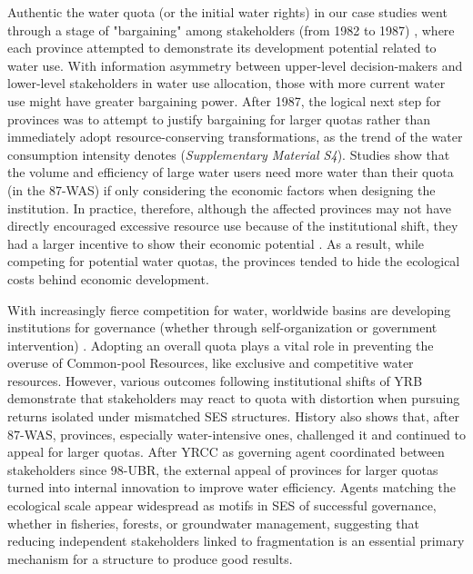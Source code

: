 Authentic the water quota (or the initial water rights) in our case studies went through a stage of "bargaining" among stakeholders (from 1982 to 1987) \cite{wang2019a, wang2019d}, where each province attempted to demonstrate its development potential related to water use.
With information asymmetry between upper-level decision-makers and lower-level stakeholders in water use allocation, those with more current water use might have greater bargaining power.
After 1987, the logical next step for provinces was to attempt to justify bargaining for larger quotas rather than immediately adopt resource-conserving transformations, as the trend of the water consumption intensity denotes (\textit{Supplementary Material S4}).
Studies show that the volume and efficiency of large water users need more water than their quota (in the 87-WAS) if only considering the economic factors when designing the institution.
In practice, therefore, although the affected provinces may not have directly encouraged excessive resource use because of the institutional shift, they had a larger incentive to show their economic potential
\cite{krieger1955, ostrom1990}.
As a result, while competing for potential water quotas, the provinces tended to hide the ecological costs behind economic development.

With increasingly fierce competition for water, worldwide basins are developing institutions for governance (whether through self-organization or government intervention) \cite{andersson2020, wutich2009, cumming2020b}.
Adopting an overall quota plays a vital role in preventing the overuse of Common-pool Resources, like exclusive and competitive water resources.
However, various outcomes following institutional shifts of YRB demonstrate that stakeholders may react to quota with distortion when pursuing returns isolated under mismatched SES structures.
History also shows that, after 87-WAS, provinces, especially water-intensive ones, challenged it and continued to appeal for larger quotas.
After YRCC as governing agent coordinated between stakeholders since 98-UBR, the external appeal of provinces for larger quotas turned into internal innovation to improve water efficiency.
Agents matching the ecological scale appear widespread as motifs in SES of successful governance, whether in fisheries, forests, or groundwater management, suggesting that reducing independent stakeholders linked to fragmentation is an essential primary mechanism for a structure to produce good results.
